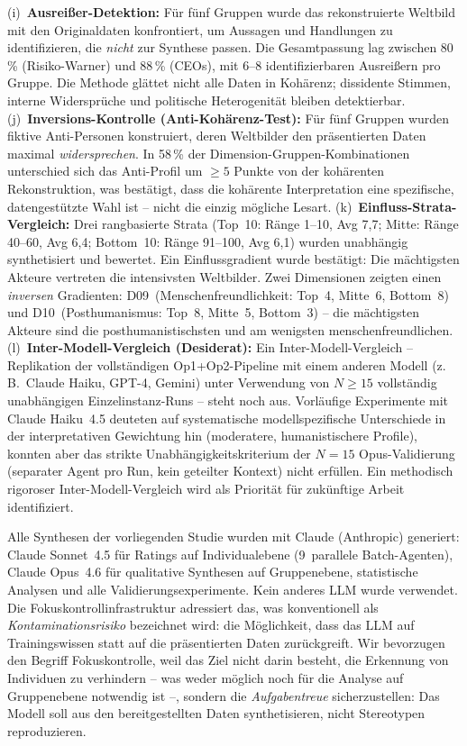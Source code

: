 \documentclass[12pt,a4paper]{article}
\begin{document}
(i)~\textbf{Ausreißer-Detektion:} Für fünf Gruppen wurde das rekonstruierte Weltbild mit den Originaldaten konfrontiert, um Aussagen und Handlungen zu identifizieren, die \emph{nicht} zur Synthese passen. Die Gesamtpassung lag zwischen 80\,\% (Risiko-Warner) und 88\,\% (CEOs), mit 6--8 identifizierbaren Ausreißern pro Gruppe. Die Methode glättet nicht alle Daten in Kohärenz; dissidente Stimmen, interne Widersprüche und politische Heterogenität bleiben detektierbar.
(j)~\textbf{Inversions-Kontrolle (Anti-Kohärenz-Test):} Für fünf Gruppen wurden fiktive Anti-Personen konstruiert, deren Weltbilder den präsentierten Daten maximal \emph{widersprechen}. In 58\,\% der Dimension-Gruppen-Kombinationen unterschied sich das Anti-Profil um $\geq 5$ Punkte von der kohärenten Rekonstruktion, was bestätigt, dass die kohärente Interpretation eine spezifische, datengestützte Wahl ist -- nicht die einzig mögliche Lesart.
(k)~\textbf{Einfluss-Strata-Vergleich:} Drei rangbasierte Strata (Top~10: Ränge 1--10, Avg 7,7; Mitte: Ränge 40--60, Avg 6,4; Bottom~10: Ränge 91--100, Avg 6,1) wurden unabhängig synthetisiert und bewertet. Ein Einflussgradient wurde bestätigt: Die mächtigsten Akteure vertreten die intensivsten Weltbilder. Zwei Dimensionen zeigten einen \emph{inversen} Gradienten: D09~(Menschenfreundlichkeit: Top~4, Mitte~6, Bottom~8) und D10~(Posthumanismus: Top~8, Mitte~5, Bottom~3) -- die mächtigsten Akteure sind die posthumanistischsten und am wenigsten menschenfreundlichen.
(l)~\textbf{Inter-Modell-Vergleich (Desiderat):} Ein Inter-Modell-Vergleich -- Replikation der vollständigen Op1+Op2-Pipeline mit einem anderen Modell (z.\,B.\ Claude Haiku, GPT-4, Gemini) unter Verwendung von $N \geq 15$ vollständig unabhängigen Einzelinstanz-Runs -- steht noch aus. Vorläufige Experimente mit Claude Haiku~4.5 deuteten auf systematische modellspezifische Unterschiede in der interpretativen Gewichtung hin (moderatere, humanistischere Profile), konnten aber das strikte Unabhängigkeitskriterium der $N = 15$ Opus-Validierung (separater Agent pro Run, kein geteilter Kontext) nicht erfüllen. Ein methodisch rigoroser Inter-Modell-Vergleich wird als Priorität für zukünftige Arbeit identifiziert.

Alle Synthesen der vorliegenden Studie wurden mit Claude (Anthropic) generiert: Claude Sonnet~4.5 für Ratings auf Individualebene (9~parallele Batch-Agenten), Claude Opus~4.6 für qualitative Synthesen auf Gruppenebene, statistische Analysen und alle Validierungsexperimente. Kein anderes LLM wurde verwendet. Die Fokuskontrollinfrastruktur adressiert das, was konventionell als \emph{Kontaminationsrisiko} bezeichnet wird: die Möglichkeit, dass das LLM auf Trainingswissen statt auf die präsentierten Daten zurückgreift. Wir bevorzugen den Begriff \glqq Fokuskontrolle\grqq, weil das Ziel nicht darin besteht, die Erkennung von Individuen zu verhindern -- was weder möglich noch für die Analyse auf Gruppenebene notwendig ist --, sondern die \emph{Aufgabentreue} sicherzustellen: Das Modell soll aus den bereitgestellten Daten synthetisieren, nicht Stereotypen reproduzieren.
\end{document}

